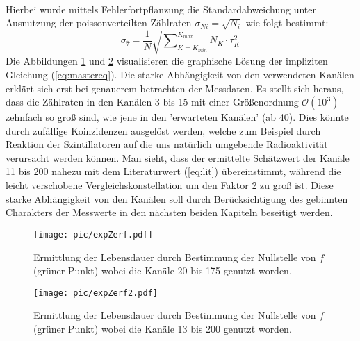 	\ \\
	Hierbei wurde mittels Fehlerfortpflanzung die Standardabweichung unter Ausnutzung der poissonverteilten Zählraten $\sigma_{Ni} = \sqrt{N_i}$ wie folgt bestimmt:
		\begin{equation} 
			\sigma_{\hat{\tau}} = \frac{1}{N}\sqrt{\sum\nolimits_{K=K_{min}}^{K_{max}} N_K\cdot \tau_K^2}
		\end{equation}	
	Die Abbildungen \ref{fig:LDexpZerf1} und \ref{fig:LDexpZerf2} visualisieren die graphische Lösung der impliziten Gleichung (\ref{eq:mastereq}). Die starke Abhängigkeit von den verwendeten Kanälen erklärt sich erst bei genauerem betrachten der Messdaten. Es stellt sich heraus, dass die Zählraten in den Kanälen 3 bis 15  mit einer Größenordnung $\mathcal{O}(10^3)$ zehnfach so groß sind, wie jene in den 'erwarteten Kanälen' (ab 40). Dies könnte durch zufällige Koinzidenzen ausgelöst werden, welche zum Beispiel durch Reaktion der Szintillatoren auf die uns natürlich umgebende Radioaktivität verursacht werden können. Man sieht, dass der ermittelte Schätzwert der Kanäle 11 bis 200 nahezu mit dem Literaturwert (\ref{eq:lit}) übereinstimmt, während die leicht verschobene Vergleichskonstellation um den Faktor 2 zu groß ist. Diese starke Abhängigkeit von den Kanälen soll durch Berücksichtigung des gebinnten Charakters der Messwerte in den nächsten beiden Kapiteln beseitigt werden. \\
		\begin{figure}[ht]
		    \centering
		    \captionsetup{justification=centering}
		    \texttt{[image: pic/expZerf.pdf]}
			\caption{Ermittlung der Lebensdauer durch Bestimmung der Nullstelle von $f$ (grüner Punkt) wobei die Kanäle 20 bis 175 genutzt worden.}
			\label{fig:LDexpZerf1}
		\end{figure}	
		
		\begin{figure}[ht]
			\centering
			\captionsetup{justification=centering}
		    \texttt{[image: pic/expZerf2.pdf]}
		    \caption{Ermittlung der Lebensdauer durch Bestimmung der Nullstelle von $f$ (grüner Punkt) wobei die Kanäle 13 bis 200 genutzt worden.}
		    \label{fig:LDexpZerf2}
		\end{figure}
			
